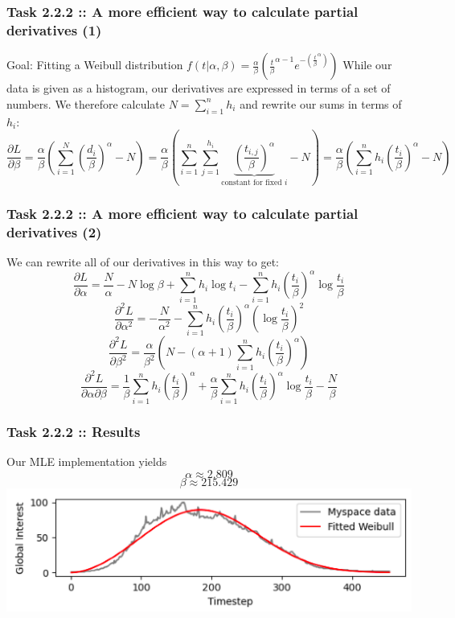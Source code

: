 \documentclass[10pt,aspectratio=169,handout]{beamer}
\begin{document}
\begin{frame}
    \frametitle{Task 2.2.2 :: A more efficient way to calculate partial derivatives (1)}

    Goal: Fitting a Weibull distribution $f(t|\alpha,\beta)=\frac{\alpha}{\beta} \left(\frac{t}{\beta}^{\alpha-1}e^{-\left(\frac{t}{\beta}^\alpha\right)}\right)$
    While our data is given as a histogram, our derivatives are expressed in terms of a set of numbers.
    We therefore calculate $N=\sum_{i=1}^n h_i$ and rewrite our sums in terms of $h_i$:
    \[\frac{\partial L}{\partial\beta}=\frac{\alpha}{\beta}\left(\sum_{i=1}^N \left(\frac{d_i}{\beta}\right)^\alpha-N\right)=\frac{\alpha}{\beta}\left(\sum_{i=1}^n \sum_{j=1}^{h_i}\underbrace{\left(\frac{t_{i,j}}{\beta}\right)^\alpha}_{\text{constant for fixed }i}-N\right)=\frac{\alpha}{\beta}\left(\sum_{i=1}^n h_i\left(\frac{t_i}{\beta}\right)^\alpha-N\right)\]
\end{frame}

\begin{frame}
    \frametitle{Task 2.2.2 :: A more efficient way to calculate partial derivatives (2)}
    We can rewrite all of our derivatives in this way to get:
    \[ \frac{\partial L}{\partial \alpha} = \frac{N}{\alpha}-N\log\beta+\sum_{i=1}^n h_i \log t_i-\sum_{i=1}^n h_i \left(\frac{t_i}{\beta}\right)^\alpha \log\frac{t_i}{\beta}\]
    \[\frac{\partial^2 L}{\partial \alpha^2}=-\frac{N}{\alpha^2}-\sum_{i=1}^n h_i \left(\frac{t_i}{\beta}\right)^\alpha \left(\log \frac{t_i}{\beta}\right)^2\] 
    \[\frac{\partial^2 L}{\partial \beta^2} = \frac{\alpha}{\beta^2}\left(N-(\alpha+1)\sum_{i=1}^n h_i \left(\frac{t_i}{\beta}\right)^\alpha\right)\] 
    \[ \frac{\partial^2 L}{\partial \alpha \partial \beta} = \frac{1}{\beta} \sum_{i=1}^n h_i\left(\frac{t_i}{\beta}\right)^\alpha +\frac{\alpha}{\beta}\sum_{i=1}^n h_i\left(\frac{t_i}{\beta}\right)^\alpha \log \frac{t_i}{\beta}-\frac{N}{\beta}\]
\end{frame}

\begin{frame}
    \frametitle{Task 2.2.2 :: Results}
    Our MLE implementation yields \[\alpha\approx 2.809\]
    \[\beta\approx 215.429\]
        \includegraphics[width=\textwidth]{images/Fitted_Weibull_T2.png}
\end{frame}
\end{document}
